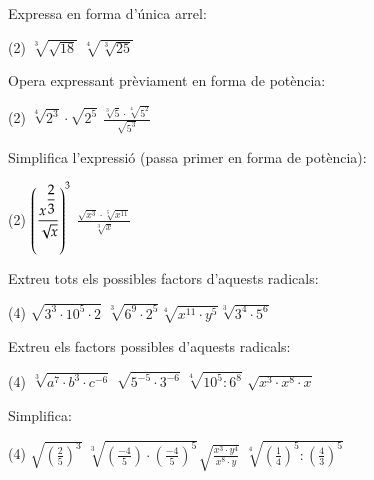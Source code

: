 \begin{mylist} 
 \exer  Expressa en forma d'única arrel:   
 \begin{tasks}(2)
 	\task  $\sqrt[{3}]{\sqrt{18} } $   \task  $\sqrt[{4}]{\sqrt[{3}]{25} } $
 \end{tasks}
 
 \exer  Opera expressant prèviament en forma de potència:  
 \begin{tasks}(2)
 	\task  $\sqrt[{4}]{2^{3} } \cdot \sqrt{2^{5} } $   \task  $\frac{\sqrt[{3}]{5} \cdot \sqrt[{4}]{5^{2} } }{\sqrt{5^{3} } } $
 \end{tasks}
\answers{[$2^{13/4}=\sqrt[4]{2^{13}}$, $5^{-2/3}=\sqrt[3]{5^{-2}}$]}
 
 \exer  Simplifica l'expressió (passa primer en forma de potència):   
 \begin{tasks}(2)
 	\task  $\left(\frac{x^{\ofrac{2}{3} } }{\sqrt{x} } \right)^{3} $   \task  $\frac{\sqrt{x^{3} } \cdot \sqrt[{5}]{x^{11} } }{\sqrt[{3}]{x} } $
 \end{tasks}
 \answers{[$x^{1/2}=\sqrt{x}$, $x^{101/30}=\sqrt[30]{x^{101}}$]}
 
 \exer  Extreu tots els possibles factors d'aquests radicals:
 \begin{tasks}(4)
 	\task \textbf{ $\sqrt{3^{3} \cdot 10^{5} \cdot 2} $}  \task  \textbf{$\sqrt[{3}]{6^{9} \cdot 2^{5} } $}${}^{  }$\task  \textbf{$\sqrt[{4}]{x^{11} \cdot y^{5} } $}${}^{  }$\task  \textbf{$\sqrt[{3}]{3^{4} \cdot 5^{6} } $}
 \end{tasks}
 
 \exer  Extreu els factors possibles d'aquests radicals:
 \begin{tasks}(4)
 	\task ${}^{ }$\textbf{$\sqrt[{3}]{a^{7} \cdot b^{3} \cdot c^{-6} } $ }${}^{ }$\task  \textbf{$\sqrt{5^{-5} \cdot 3^{-6} } $ } \task  \textbf{$\sqrt[{4}]{10^{5} :6^{8} } $}   \task  \textbf{$\sqrt{x^{3} \cdot x^{8} \cdot x} $}
 \end{tasks}
 
 \exer  Simplifica:  
 \begin{tasks}(4)
 	\task  $\sqrt{\left(\frac{2}{5} \right)^{3} } $ \task  $\sqrt[{3}]{\left(\frac{-4}{5} \right)\cdot \left(\frac{-4}{5} \right)^{5} } $${}^{ }$\task  $\sqrt{\frac{x^{3} \cdot y^{4} }{x^{8} \cdot y} } $  \task  $\sqrt[{4}]{\left(\frac{1}{4} \right)^{5} :\left(\frac{4}{3} \right)^{5} } $
 \end{tasks}
 

\end{mylist}
